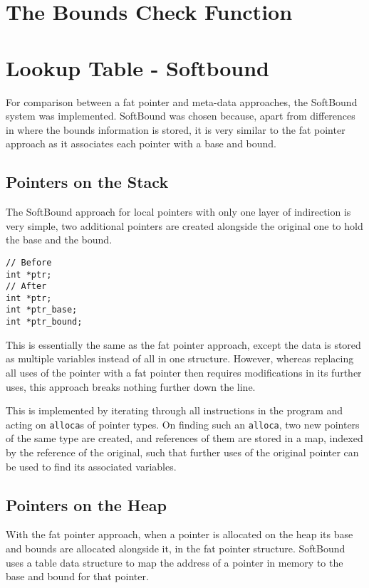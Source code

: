 \section{The Bounds Check Function}

\section{Lookup Table - Softbound}

For comparison between a fat pointer and meta-data approaches, the SoftBound system was implemented.
SoftBound was chosen because, apart from differences in where the bounds information is stored, it is very similar to the fat pointer approach as it associates each pointer with a base and bound.

\subsection{Pointers on the Stack}

The SoftBound approach for local pointers with only one layer of indirection is very simple, two additional pointers are created alongside the original one to hold the base and the bound.

\begin{verbatim}
// Before
int *ptr;
// After
int *ptr;
int *ptr_base;
int *ptr_bound;
\end{verbatim}

This is essentially the same as the fat pointer approach, except the data is stored as multiple variables instead of all in one structure.
However, whereas replacing all uses of the pointer with a fat pointer then requires modifications in its further uses, this approach breaks nothing further down the line.

This is implemented by iterating through all instructions in the program and acting on \verb!alloca!s of pointer types.
On finding such an \verb!alloca!, two new pointers of the same type are created, and references of them are stored in a map, indexed by the reference of the original, such that further uses of the original pointer can be used to find its associated variables.

\subsection{Pointers on the Heap}

With the fat pointer approach, when a pointer is allocated on the heap its base and bounds are allocated alongside it, in the fat pointer structure.
SoftBound uses a table data structure to map the address of a pointer in memory to the base and bound for that pointer.

